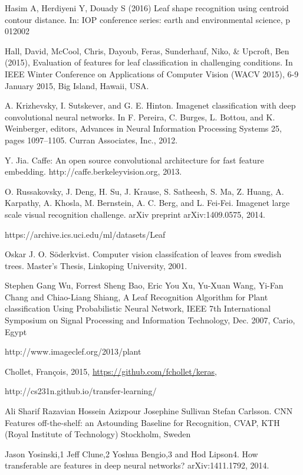 \documentclass[journal, 10pt]{IEEEtran}
\begin{document}
\begin{thebibliography}{1}
    Hasim A, Herdiyeni Y, Douady S (2016) Leaf shape recognition using centroid contour distance. In: IOP conference series: earth and environmental science, p 012002

    Hall, David, McCool, Chris, Dayoub, Feras, Sunderhauf, Niko, \& Upcroft, Ben (2015), Evaluation of features for leaf classification in challenging conditions. In IEEE Winter Conference on Applications of Computer Vision (WACV 2015), 6-9 January 2015, Big Island, Hawaii, USA.


    A. Krizhevsky, I. Sutskever, and G. E. Hinton. Imagenet classification with deep convolutional neural networks. In F. Pereira, C. Burges, L. Bottou, and K. Weinberger, editors, Advances in Neural Information Processing Systems 25, pages 1097–1105. Curran Associates, Inc., 2012.

    Y. Jia. Caffe: An open source convolutional architecture for fast feature embedding. http://caffe.berkeleyvision.org, 2013.

    O. Russakovsky, J. Deng, H. Su, J. Krause, S. Satheesh, S. Ma, Z. Huang, A. Karpathy, A. Khosla, M. Bernstein, A. C. Berg, and L. Fei-Fei. Imagenet large scale visual recognition challenge. arXiv preprint arXiv:1409.0575, 2014.

    https://archive.ics.uci.edu/ml/datasets/Leaf

    Oskar J. O. Söderkvist. Computer vision classifcation of leaves from swedish trees. Master's Thesis, Linkoping University, 2001.

    Stephen Gang Wu, Forrest Sheng Bao, Eric You Xu, Yu-Xuan Wang, Yi-Fan Chang and Chiao-Liang Shiang, A Leaf Recognition Algorithm for Plant classification Using Probabilistic Neural Network, IEEE 7th International Symposium on Signal Processing and Information Technology, Dec. 2007, Cario, Egypt

    http://www.imageclef.org/2013/plant

    Chollet, Fran\c{c}ois, 2015, \url{https://github.com/fchollet/keras},

    http://cs231n.github.io/transfer-learning/

    Ali Sharif Razavian Hossein Azizpour Josephine Sullivan Stefan Carlsson. CNN Features off-the-shelf: an Astounding Baseline for Recognition, CVAP, KTH (Royal Institute of Technology) Stockholm, Sweden

    Jason Yosinski,1 Jeff Clune,2 Yoshua Bengio,3 and Hod Lipson4. How transferable are features in deep neural networks? arXiv:1411.1792, 2014.
\end{thebibliography}
\end{document}

